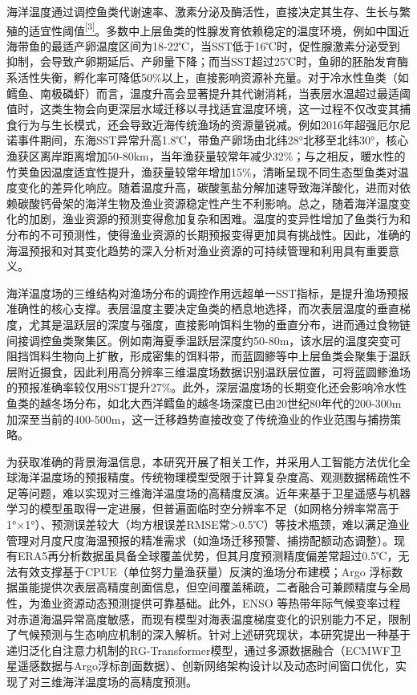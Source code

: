 \documentclass[
  12pt,
]{article}
\begin{document}
海洋温度通过调控鱼类代谢速率、激素分泌及酶活性，直接决定其生存、生长与繁殖的适宜性阈值\hyperref[_Ref165148613]{\textsuperscript{{[}3{]}}}。多数中上层鱼类的性腺发育依赖稳定的温度环境，例如中国近海带鱼的最适产卵温度区间为18-22℃，当SST低于16℃时，促性腺激素分泌受到抑制，会导致产卵期延后、产卵量下降；而当SST超过25℃时，鱼卵的胚胎发育酶系活性失衡，孵化率可降低50\%以上，直接影响资源补充量。对于冷水性鱼类（如鳕鱼、南极磷虾）而言，温度升高会显著提升其代谢消耗，当表层水温超过最适阈值时，这类生物会向更深层水域迁移以寻找适宜温度环境，这一过程不仅改变其捕食行为与生长模式，还会导致近海传统渔场的资源量锐减。例如2016年超强厄尔尼诺事件期间，东海SST异常升高1.8℃，带鱼产卵场由北纬28°北移至北纬30°，核心渔获区离岸距离增加50-80km，当年渔获量较常年减少32\%；与之相反，暖水性的竹荚鱼因温度适宜性提升，渔获量较常年增加15\%，清晰呈现不同生态型鱼类对温度变化的差异化响应。随着温度升高，碳酸氢盐分解加速导致海洋酸化，进而对依赖碳酸钙骨架的海洋生物及渔业资源稳定性产生不利影响。总之，随着海洋温度变化的加剧，渔业资源的预测变得愈加复杂和困难。温度的变异性增加了鱼类行为和分布的不可预测性，使得渔业资源的长期预报变得更加具有挑战性。因此，准确的海温预报和对其变化趋势的深入分析对渔业资源的可持续管理和利用具有重要意义。

海洋温度场的三维结构对渔场分布的调控作用远超单一SST指标，是提升渔场预报准确性的核心支撑。表层温度主要决定鱼类的栖息地选择，而次表层温度的垂直梯度，尤其是温跃层的深度与强度，直接影响饵料生物的垂直分布，进而通过食物链间接调控鱼类聚集区。例如南海夏季温跃层深度约50-80m，该水层的温度突变可阻挡饵料生物向上扩散，形成密集的饵料带，而蓝圆鲹等中上层鱼类会聚集于温跃层附近摄食，因此利用高分辨率三维温度场数据识别温跃层位置，可将蓝圆鲹渔场的预报准确率较仅用SST提升27\%。此外，深层温度场的长期变化还会影响冷水性鱼类的越冬场分布，如北大西洋鳕鱼的越冬场深度已由20世纪80年代的200-300m加深至当前的400-500m，这一迁移趋势直接改变了传统渔业的作业范围与捕捞策略。

为获取准确的背景海温信息，本研究开展了相关工作，并采用人工智能方法优化全球海洋温度场的预报精度。传统物理模型受限于计算复杂度高、观测数据稀疏性不足等问题，难以实现对三维海洋温度场的高精度反演。近年来基于卫星遥感与机器学习的模型虽取得一定进展，但普遍面临时空分辨率不足（如网格分辨率常高于1°×1°）、预测误差较大（均方根误差RMSE常\textgreater0.5℃）等技术瓶颈，难以满足渔业管理对月度尺度海温预报的精准需求（如渔场迁移预警、捕捞配额动态调整）。现有ERA5再分析数据虽具备全球覆盖优势，但其月度预测精度偏差常超过0.5℃，无法有效支撑基于CPUE（单位努力量渔获量）反演的渔场分布建模；Argo
浮标数据虽能提供次表层高精度剖面信息，但空间覆盖稀疏，二者融合可兼顾精度与全局性，为渔业资源动态预测提供可靠基础。此外，ENSO
等热带年际气候变率过程对赤道海温异常高度敏感，而现有模型对海表温度梯度变化的识别能力不足，限制了气候预测与生态响应机制的深入解析。针对上述研究现状，本研究提出一种基于递归泛化自注意力机制的RG-Transformer模型，通过多源数据融合（ECMWF卫星遥感数据与Argo浮标剖面数据）、创新网络架构设计以及动态时间窗口优化，实现了对三维海洋温度场的高精度预测。
\end{document}
